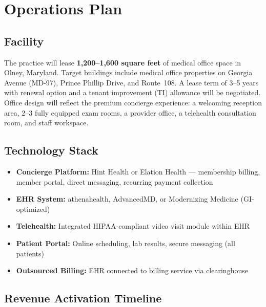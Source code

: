 \documentclass[11pt,letterpaper]{article}
\begin{document}
\newpage

\section{Operations Plan}

\subsection{Facility}

The practice will lease \textbf{1,200--1,600 square feet} of medical office space in Olney, Maryland. Target buildings include medical office properties on Georgia Avenue (MD-97), Prince Phillip Drive, and Route~108. A lease term of 3--5 years with renewal option and a tenant improvement (TI) allowance will be negotiated. Office design will reflect the premium concierge experience: a welcoming reception area, 2--3 fully equipped exam rooms, a provider office, a telehealth consultation room, and staff workspace.

\subsection{Technology Stack}

\begin{itemize}
  \item \textbf{Concierge Platform:} Hint Health or Elation Health --- membership billing, member portal, direct messaging, recurring payment collection
  \item \textbf{EHR System:} athenahealth, AdvancedMD, or Modernizing Medicine (GI-optimized)
  \item \textbf{Telehealth:} Integrated HIPAA-compliant video visit module within EHR
  \item \textbf{Patient Portal:} Online scheduling, lab results, secure messaging (all patients)
  \item \textbf{Outsourced Billing:} EHR connected to billing service via clearinghouse
\end{itemize}

\subsection{Revenue Activation Timeline}
\end{document}

